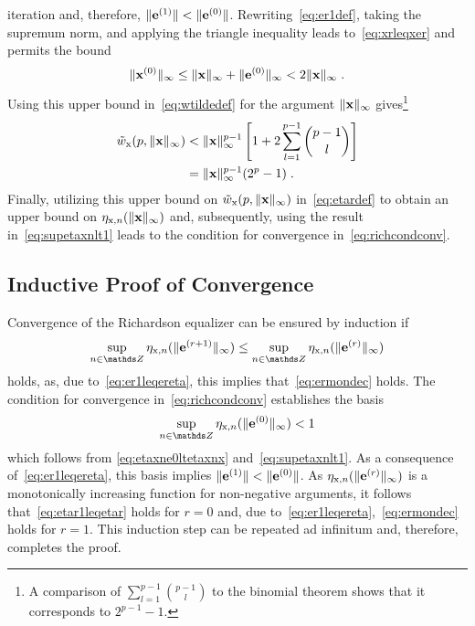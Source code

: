 \documentclass[10pt,twocolumn,twoside]{IEEEtran}
\begin{document}
iteration and, therefore, $\lVert\bm{\mathrm{e}}^{(1)}\rVert < \lVert\bm{\mathrm{e}}^{(0)}\rVert$.
Rewriting~\eqref{eq:er1def}, taking the supremum norm, and applying the
triangle inequality leads to~\eqref{eq:xrleqxer} and permits the bound
\begin{align*}
	\lVert\bm{\mathrm{x}}^{(0)}\rVert_\infty
		\leq \lVert\bm{\mathrm{x}}\rVert_\infty + \lVert\bm{\mathrm{e}}^{(0)}\rVert_\infty
		< 2 \lVert\bm{\mathrm{x}}\rVert_\infty\;.
\end{align*}
Using this upper bound in~\eqref{eq:wtildedef} for the argument $\lVert\bm{\mathrm{x}}\rVert_\infty$
gives\footnote{A comparison of $\sum_{l=1}^{p-1} \binom{p-1}{l}$ to the binomial theorem
shows that it corresponds to $2^{p-1}-1$.}
\begin{align*}
	\tilde{w}_{\mathrm{x}}(p,\lVert\bm{\mathrm{x}}\rVert_\infty)
		&< \lVert\bm{\mathrm{x}}\rVert_\infty^{p-1}\left[ 1 + 2 \sum_{l=1}^{p-1} \binom{p-1}{l} \right] \\
		&= \lVert\bm{\mathrm{x}}\rVert_\infty^{p-1}(2^p-1) \;.
\end{align*}
Finally, utilizing this upper bound on $\tilde{w}_{\mathrm{x}}(p,\lVert\bm{\mathrm{x}}\rVert_\infty)$ in~\eqref{eq:etardef} to
obtain an upper bound on $\eta_{\mathrm{x},n}(\lVert\bm{\mathrm{x}}\rVert_\infty)$ and, subsequently, using the result
in~\eqref{eq:supetaxnlt1} leads to the condition for convergence in~\eqref{eq:richcondconv}.


\subsection{Inductive Proof of Convergence}

Convergence of the Richardson equalizer can be ensured by induction if
\begin{align}
	\sup_{n\in\Z} \seta{x}{n}(\norminf{\vm{e}^{(r+1)}}) \leq \sup_{n\in\Z} \seta{x}{n}(\norminf{\vm{e}^{(r)}})
	\label{eq:etar1leqetar}
\end{align}
holds, as, due to~\eqref{eq:er1leqereta}, this implies that~\eqref{eq:ermondec} holds.
The condition for convergence in~\eqref{eq:richcondconv} establishes the basis
\begin{align*}
	\sup_{n\in\Z} \seta{x}{n}(\norminf{\vm{e}^{(0)}}) < 1
\end{align*}
which follows from \eqref{eq:etaxne0ltetaxnx} and~\eqref{eq:supetaxnlt1}. As a
consequence of~\eqref{eq:er1leqereta}, this basis implies $\lVert\bm{\mathrm{e}}^{(1)}\rVert < \lVert\bm{\mathrm{e}}^{(0)}\rVert$.
As $\eta_{\mathrm{x},n}(\lVert\bm{\mathrm{e}}^{(r)}\rVert_\infty)$ is a monotonically increasing function for
non-negative arguments, it follows that~\eqref{eq:etar1leqetar} holds for $r=0$
and, due to~\eqref{eq:er1leqereta},~\eqref{eq:ermondec} holds for $r=1$.
This induction step can be repeated ad infinitum and, therefore, completes the proof.
\end{document}
